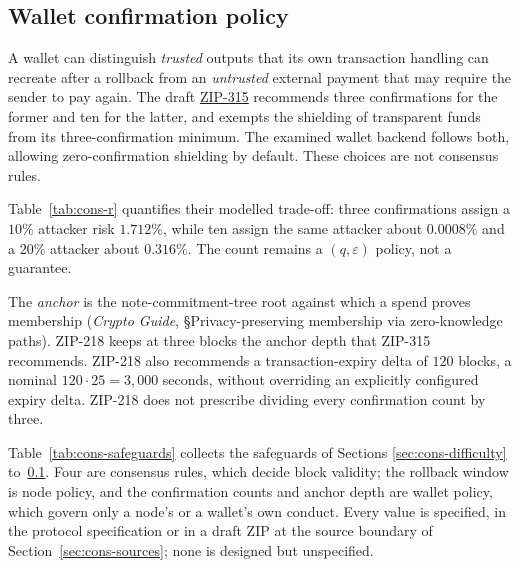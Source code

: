\documentclass[11pt,a4paper]{article}
\theoremstyle{definition}
\begin{document}
\subsection{Wallet confirmation policy}\label{sec:cons-walletpolicy}

A wallet can distinguish \emph{trusted} outputs that its own transaction
handling can recreate after a rollback from an \emph{untrusted} external
payment that may require the sender to pay again. The draft
\href{https://zips.z.cash/zip-0315}{ZIP-315} recommends three confirmations
for the former and ten for the latter, and exempts the shielding of
transparent funds from its three-confirmation minimum. The examined wallet
backend follows both, allowing zero-confirmation shielding by default. These
choices are not consensus rules.

Table~\ref{tab:cons-r} quantifies their modelled trade-off: three
confirmations assign a $10\%$ attacker risk $1.712\%$, while ten assign the
same attacker about $0.0008\%$ and a $20\%$ attacker about $0.316\%$.
The count remains a $(q,\varepsilon)$ policy, not a guarantee.

The \emph{anchor} is the note-commitment-tree root against which a spend
proves membership (\emph{Crypto Guide}, \S{}Privacy-preserving membership
via zero-knowledge paths). ZIP-218 keeps at three blocks the anchor depth
that ZIP-315 recommends. ZIP-218 also recommends a transaction-expiry
delta of $120$ blocks, a nominal $120\cdot25=3{,}000$ seconds, without
overriding an explicitly configured expiry delta. ZIP-218 does not
prescribe dividing every confirmation count by three.

Table~\ref{tab:cons-safeguards} collects the safeguards of
Sections \ref{sec:cons-difficulty} to~\ref{sec:cons-walletpolicy}. Four are
consensus rules, which decide block validity; the rollback window is node
policy, and the confirmation counts and anchor depth are wallet policy,
which govern only a node's or a wallet's own conduct. Every value is
specified, in the protocol specification or in a draft ZIP at the source
boundary of Section~\ref{sec:cons-sources}; none is designed but
unspecified.
\end{document}

